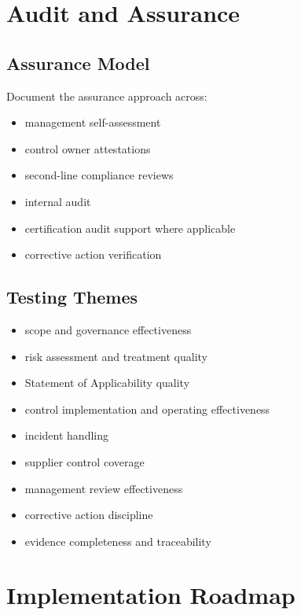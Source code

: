 \documentclass[
  letterpaper,
  DIV=11,
  numbers=noendperiod]{scrartcl}
\providecommand{\tightlist}{%
  \setlength{\itemsep}{0pt}\setlength{\parskip}{0pt}}
\begin{document}
\section{Audit and Assurance}\label{audit-and-assurance}

\subsection{Assurance Model}\label{assurance-model}

Document the assurance approach across:

\begin{itemize}
\tightlist
\item
  management self-assessment
\item
  control owner attestations
\item
  second-line compliance reviews
\item
  internal audit
\item
  certification audit support where applicable
\item
  corrective action verification
\end{itemize}

\subsection{Testing Themes}\label{testing-themes}

\begin{itemize}
\tightlist
\item
  scope and governance effectiveness
\item
  risk assessment and treatment quality
\item
  Statement of Applicability quality
\item
  control implementation and operating effectiveness
\item
  incident handling
\item
  supplier control coverage
\item
  management review effectiveness
\item
  corrective action discipline
\item
  evidence completeness and traceability
\end{itemize}

\section{Implementation Roadmap}\label{implementation-roadmap}
\end{document}
